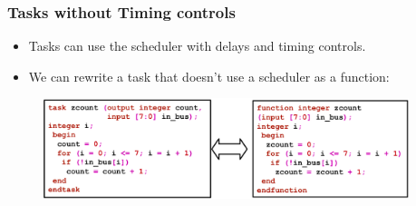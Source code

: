 \documentclass[t, notes, xcolor=table]{beamer}
\begin{document}
\begin{frame}
\frametitle{Tasks without Timing controls}
\begin{itemize}
\item Tasks can use the scheduler with delays and timing controls.
\item We can rewrite a task that doesn't use a scheduler as a function:
\end{itemize}
\begin{figure}
    \includegraphics[width=0.95\textwidth]{img/10_task_func.png}
\end{figure}
\end{frame}
\end{document}
